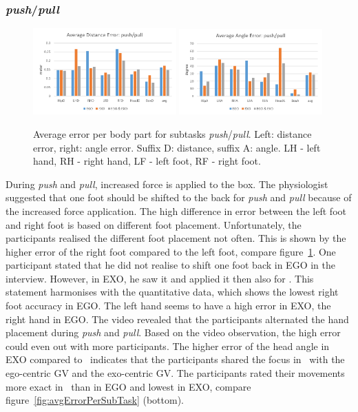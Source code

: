 \subsubsection{\textit{push}/\textit{pull}}
\begin{figure}[H]
	\centering
	\includegraphics[width=0.49\textwidth]{figures/distanceErrorPushPull.png}
	\includegraphics[width=0.49\textwidth]{figures/angleErrorPushPull.png}
	\caption[Average error per body part for subtasks \textit{push}/\textit{pull}.]{Average error per body part for subtasks \textit{push}/\textit{pull}. Left: distance error, right: angle error. Suffix D: distance, suffix A: angle. LH - left hand, RH - right hand, LF - left foot, RF - right foot.}
	\label{fig:errorPushPull}
\end{figure}
During \textit{push} and \textit{pull}, increased force is applied to the box. The physiologist suggested that one foot should be shifted to the back for \textit{push} and \textit{pull} because of the increased force application. The high difference in error between the left foot and right foot is based on different foot placement. Unfortunately, the participants realised the different foot placement not often. This is shown by the higher error of the right foot compared to the left foot, compare figure~\ref{fig:errorPushPull}. One participant stated that he did not realise to shift one foot back in EGO in the interview. However, in EXO, he saw it and applied it then also for \combi. This statement harmonises with the quantitative data, which shows the lowest right foot accuracy in EGO. The left hand seems to have a high error in EXO, the right hand in EGO. The video revealed that the participants alternated the hand placement during \textit{push} and \textit{pull}. Based on the video observation, the high error could even out with more participants. The higher error of the head angle in EXO compared to \combi\ indicates that the participants shared the focus in \combi\ with the ego-centric GV and the exo-centric GV. The participants rated their movements more exact in \combi\ than in EGO and lowest in EXO, compare figure~\ref{fig:avgErrorPerSubTask} (bottom).

